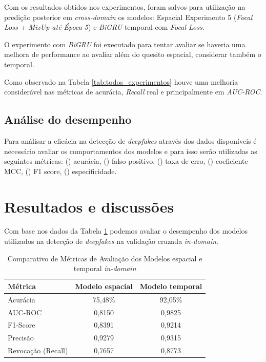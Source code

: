 \documentclass[12pt]{article}
\begin{document}
Com os resultados obtidos nos experimentos, foram salvos para utilização na predição posterior em \textit{cross-domain}
os modelos: Espacial Experimento 5 (\textit{Focal Loss + MixUp até Época 5}) e \textit{BiGRU} temporal com \textit{Focal Loss}.

O experimento com \textit{BiGRU} foi executado para tentar avaliar se haveria uma melhora de performance ao avaliar além do quesito espacial,
considerar também o temporal. \cite{abboodEnhancingDeepfakeDetection2026}

Como observado na Tabela \ref{tab:todos_experimentos} houve uma melhoria considerável nas métricas de acurácia,
\textit{Recall} real e principalmente em \textit{AUC-ROC}.

\subsection{Análise do desempenho}

Para análisar a eficácia na detecção de \textit{deepfakes} através dos dados disponíveis é 
necessário avaliar os comportamentos dos modelos e para isso 
serão utilizadas as seguintes métricas:
() acurácia,
() falso positivo,
() taxa de erro,
() coeficiente MCC,
() F1 score,
() especificidade.


\section{Resultados e discussões}
Com base nos dados da Tabela \ref{tab:metricas} podemos avaliar
o desempenho dos modelos utilizados
na detecção de \textit{deepfakes} na validação cruzada \textit{in-domain}.

\begin{table}[htbp]
\centering
\caption{Comparativo de Métricas de Avaliação dos Modelos espacial e temporal \textit{in-domain}}
\label{tab:metricas}
\begin{tabular}{lcc}
\toprule
\textbf{Métrica} & \textbf{Modelo espacial} & \textbf{Modelo temporal} \\
\midrule
Acurácia           & 75,48\% & 92,05\% \\
AUC-ROC            & 0,8150  & 0,9825  \\
F1-Score           & 0,8391  & 0,9214  \\
Precisão           & 0,9279  & 0,9315  \\
Revocação (Recall) & 0,7657  & 0,8773  \\
\bottomrule
\end{tabular}
\end{table}
\end{document}

